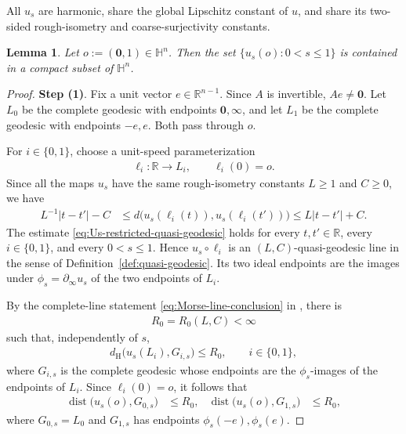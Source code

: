 \documentclass[11pt]{amsart}
\theoremstyle{plain}
\newtheorem{lemma}[theorem]{Lemma}
\theoremstyle{plain}
\theoremstyle{plain}
\newcommand{\Hn}{\mathbb H^n}
\newcommand{\dist}{\operatorname{dist}}
\newcommand{\R}{\mathbb R}
\numberwithin{equation}{section}
\begin{document}
All \(u_s\) are harmonic,
share the global Lipschitz constant of \(u\), and share its two-sided
rough-isometry and coarse-surjectivity constants.



\begin{lemma}\label{lem:basepoint_compact}
Let $o:=(\mathbf{0},1)\in\Hn$.  Then the set
$\{u_s(o):0<s\leq1\}$ is contained in a compact subset of \(\Hn\).
\end{lemma}

\begin{proof}
\textbf{Step (1)}. Fix a unit vector \(e\in\R^{n-1}\).  Since \(A\) is invertible,
\(Ae\neq\mathbf{0}\).  Let \(L_0\) be the complete geodesic with endpoints
\(\mathbf{0},\infty\), and let \(L_1\) be the complete geodesic with endpoints
\(-e,e\).  Both pass through \(o\).

For \(i\in\{0,1\}\), choose a unit-speed parameterization
\begin{align}
\ell_i:\mathbb R\longrightarrow L_i,
\qquad
\ell_i(0)=o.
\nonumber
\end{align}
Since all the maps \(u_s\) have the same rough-isometry constants
\(L\geq1\) and \(C\geq0\), we have
\begin{align}
L^{-1}|t-t'|-C
&\leq
d\bigl(u_s(\ell_i(t)),u_s(\ell_i(t'))\bigr)
\leq
L|t-t'|+C.
\label{eq:Us-restricted-quasi-geodesic}
\end{align}
The estimate \eqref{eq:Us-restricted-quasi-geodesic} holds for every
\(t,t'\in\mathbb R\), every \(i\in\{0,1\}\), and every
\(0<s\leq1\).  Hence \(u_s\circ\ell_i\) is an
\((L,C)\)-quasi-geodesic line in the sense of
Definition~\ref{def:quasi-geodesic}.  Its two ideal endpoints are the
images under \(\phi_s=\partial_\infty u_s\) of the two endpoints of \(L_i\).

By the complete-line statement
\eqref{eq:Morse-line-conclusion} in , there is
\begin{align}
R_0=R_0(L,C)<\infty
\nonumber
\end{align}
such that, independently of \(s\),
\begin{align}
d_{\mathrm H}\bigl(u_s(L_i),G_{i,s}\bigr)\leq R_0,
\qquad i\in\{0,1\},
\nonumber
\end{align}
where \(G_{i,s}\) is the complete geodesic whose endpoints are the
\(\phi_s\)-images of the endpoints of \(L_i\).  Since
\(\ell_i(0)=o\), it follows that
\begin{align}
\dist\bigl(u_s(o),G_{0,s}\bigr)&\leq R_0,
&
\dist\bigl(u_s(o),G_{1,s}\bigr)&\leq R_0,
\label{eq:close_two_geodesics}
\end{align}
where
$
G_{0,s}=L_0
$
and \(G_{1,s}\) has endpoints \(\phi_s(-e),\phi_s(e)\).


\end{proof}
\end{document}
